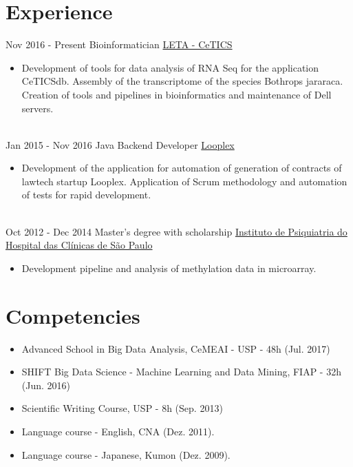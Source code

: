 \documentclass[letterpaper]{twentysecondcv} %
\begin{document}

\section{Experience}

\begin{twenty} %
\twentyitem
    	{Nov 2016 - }
		{Present}
        {Bioinformatician}
        {\href{http://cetics.butantan.gov.br/}{LETA - CeTICS}}
        {}
        {\begin{itemize}
        \item Development of tools for data analysis of RNA Seq for the application CeTICSdb. Assembly of the transcriptome of the species Bothrops jararaca. Creation of tools and pipelines in bioinformatics and maintenance of Dell servers.
        \end{itemize}}
        \\
	\twentyitem
    	{Jan 2015 - }
		{Nov 2016}
        {Java Backend Developer }
        {\href{www.looplex.com.br/}{Looplex}}
        {}
        {
        {\begin{itemize}
        \item Development of the application for automation of generation of contracts of lawtech startup Looplex. Application of Scrum methodology and automation of tests for rapid development.
    \end{itemize}}
        }
    \\   
    \twentyitem
   		{Oct 2012 - }
		{Dec 2014}
        {Master's degree with scholarship}
        {\href{www.ipqhc.org.br}{Instituto de Psiquiatria do Hospital das Clínicas de São Paulo}}
        {}
        {
        {\begin{itemize}
        \item Development pipeline and analysis of methylation data in microarray.
    \end{itemize}}
        }       
\end{twenty}

\section{Competencies}
\begin{itemize}
	\item Advanced School in Big Data Analysis, CeMEAI - USP - 48h (Jul. 2017)
	\item SHIFT Big Data Science - Machine Learning and Data Mining, FIAP - 32h (Jun. 2016)
	\item Scientific Writing Course, USP - 8h (Sep. 2013)
	\item Language course - English, CNA (Dez. 2011).
	\item Language course - Japanese, Kumon (Dez. 2009).
\end{itemize}
\end{document}
